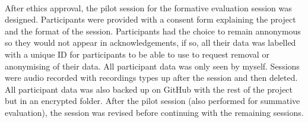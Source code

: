 \paragraph{} After ethics approval, the pilot session for the formative evaluation session was designed. Participants were provided with a consent form explaining the project and the format of the session. Participants had the choice to remain annonymous so they would not appear in acknowledgements, if so, all their data was labelled with a unique ID for participants to be able to use to request removal or anonymising of their data. All participant data was only seen by myself. Sessions were audio recorded with recordings types up after the session and then deleted. All participant data was also backed up on GitHub with the rest of the project but in an encrypted folder. After the pilot session (also performed for summative evaluation), the session was revised before continuing with the remaining sessions.
